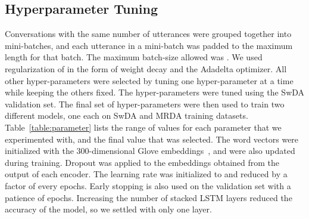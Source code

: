 \documentclass[letterpaper]{article} \usepackage{aaai18}
\begin{document}
\subsection{Hyperparameter Tuning}
Conversations with the same number of utterances were grouped together into mini-batches, and each utterance in a mini-batch was padded to the maximum length for that batch. The maximum batch-size allowed was . We used  regularization of  in the form of weight decay and the Adadelta optimizer. All other hyper-parameters were selected by tuning one hyper-parameter at a time while keeping the others fixed. The hyper-parameters were tuned using the SwDA validation set. The final set of hyper-parameters were then used to train two different models, one each on SwDA and MRDA training datasets. Table~\ref{table:parameter} lists the range of values for each parameter that we experimented with, and the final value that was selected. The word vectors were initialized with the 300-dimensional Glove embeddings~\cite{Pennington2014}, and were also updated during training. Dropout was applied to the embeddings obtained from the output of each encoder. The learning rate was initialized to  and reduced by a factor of  every  epochs. Early stopping is also used on the validation set with a patience of  epochs. Increasing the number of stacked LSTM layers reduced the accuracy of the model, so we settled with only one layer.
\end{document}
